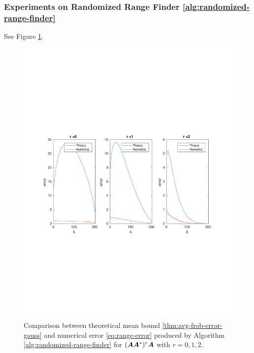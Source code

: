 \subsubsection{Experiments on Randomized Range Finder 
\ref{alg:randomized-range-finder}} See Figure \ref{fig:exp1-1}.
\begin{figure}[H]\label{fig:exp1-1}
\begin{center}
\includegraphics[width=\textwidth, trim=0cm 8cm 0cm 9cm, clip=true]{figures/1-4.pdf}
\end{center}
\caption{Comparison between theoretical mean bound \ref{thm:avg-frob-error-gauss}
and numerical error \ref{eq:range-error} produced by Algorithm \ref{alg:randomized-range-finder}
 for $(\bm{A}\bm{A}^*)^r\bm{A}$ with $r=0,1,2$. }
\end{figure}

